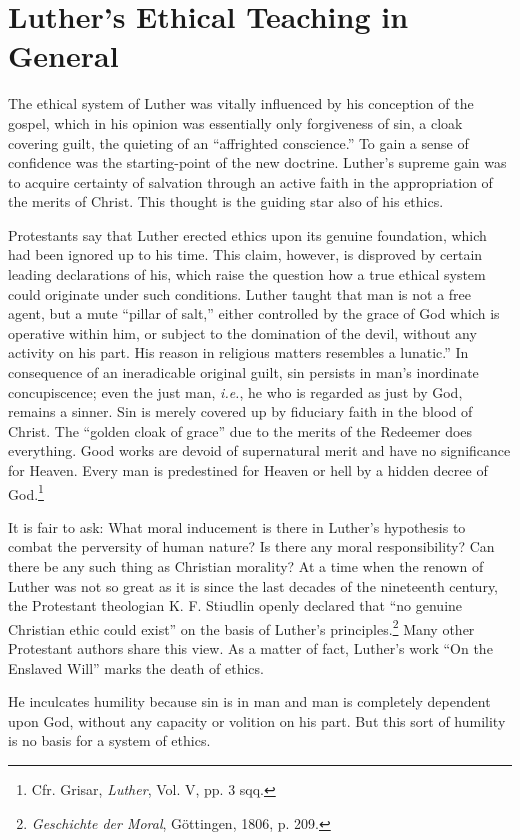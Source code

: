 \section{Luther’s Ethical Teaching in General}

The ethical system of Luther was vitally influenced by his conception of
the gospel, which in his opinion was essentially only forgiveness of sin,
a cloak covering guilt, the quieting of an “affrighted
conscience.” To gain a sense of confidence was the starting-point of
the new doctrine. Luther’s supreme gain was to acquire certainty of
salvation through an active faith in the appropriation of the merits of
Christ. This thought is the guiding star also of his ethics.

Protestants say that Luther erected ethics upon its genuine foundation,
which had been ignored up to his time. This claim, however, is
disproved by certain leading declarations of his, which raise the question
how a true ethical system could originate under such conditions.
Luther taught that man is not a free agent, but a mute “pillar of
salt,” either controlled by the grace of God which is operative within
him, or subject to the domination of the devil, without any activity
on his part. His reason in religious matters resembles a lunatic.” In
consequence of an ineradicable original guilt, sin persists in man’s
inordinate concupiscence; even the just man, \textit{i.e.}, he who is regarded
as just by God, remains a sinner. Sin is merely covered up by fiduciary
faith in the blood of Christ. The “golden cloak of grace” due to the
merits of the Redeemer does everything. Good works are devoid of
supernatural merit and have no significance for Heaven. Every man
is predestined for Heaven or hell by a hidden decree of God.\footnote{Cfr. Grisar, \textit{Luther}, Vol. V, pp. 3 sqq.}

It is fair to ask: What moral inducement is there in Luther’s hypothesis
to combat the perversity of human nature? Is there any moral
responsibility? Can there be any such thing as Christian morality? At
a time when the renown of Luther was not so great as it is since the
last decades of the nineteenth century, the Protestant theologian K.
F. Stiudlin openly declared that “no genuine Christian ethic could
exist” on the basis of Luther’s principles.\footnote{\textit{Geschichte der Moral}, Göttingen, 1806, p. 209.}
Many other Protestant
authors share this view. As a matter of fact, Luther’s work “On the
Enslaved Will” marks the death of ethics.

He inculcates humility because sin is in man and man is completely dependent
upon God, without any capacity or volition on
his part. But this sort of humility is no basis for a system of ethics.


